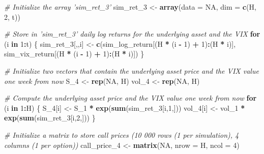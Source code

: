 \documentclass[]{article}
\newenvironment{Shaded}{\begin{snugshade}}{\end{snugshade}}
\newcommand{\CommentTok}[1]{\textcolor[rgb]{0.56,0.35,0.01}{\textit{#1}}}
\newcommand{\ControlFlowTok}[1]{\textcolor[rgb]{0.13,0.29,0.53}{\textbf{#1}}}
\newcommand{\DataTypeTok}[1]{\textcolor[rgb]{0.13,0.29,0.53}{#1}}
\newcommand{\DecValTok}[1]{\textcolor[rgb]{0.00,0.00,0.81}{#1}}
\newcommand{\KeywordTok}[1]{\textcolor[rgb]{0.13,0.29,0.53}{\textbf{#1}}}
\newcommand{\NormalTok}[1]{#1}
\newcommand{\OperatorTok}[1]{\textcolor[rgb]{0.81,0.36,0.00}{\textbf{#1}}}
\newcommand{\OtherTok}[1]{\textcolor[rgb]{0.56,0.35,0.01}{#1}}
\newcommand{\StringTok}[1]{\textcolor[rgb]{0.31,0.60,0.02}{#1}}
\begin{document}
\begin{Shaded}
\begin{Highlighting}[]
\CommentTok{# Initialize the array 'sim_ret_3'}
\NormalTok{sim_ret_}\DecValTok{3}\NormalTok{ <-}\StringTok{ }\KeywordTok{array}\NormalTok{(}\DataTypeTok{data =} \OtherTok{NA}\NormalTok{, }\DataTypeTok{dim =} \KeywordTok{c}\NormalTok{(H, }\DecValTok{2}\NormalTok{, t))}

\CommentTok{# Store in 'sim_ret_3' daily log returns for the underlying asset and the VIX}
\ControlFlowTok{for}\NormalTok{ (i }\ControlFlowTok{in} \DecValTok{1}\OperatorTok{:}\NormalTok{t) \{}
\NormalTok{  sim_ret_}\DecValTok{3}\NormalTok{[,,i] <-}\StringTok{ }\KeywordTok{c}\NormalTok{(sim_log_return[(H }\OperatorTok{*}\StringTok{ }\NormalTok{(i }\OperatorTok{-}\StringTok{ }\DecValTok{1}\NormalTok{) }\OperatorTok{+}\StringTok{ }\DecValTok{1}\NormalTok{)}\OperatorTok{:}\NormalTok{(H }\OperatorTok{*}\StringTok{ }\NormalTok{i)], sim_vix_return[(H }\OperatorTok{*}\StringTok{ }\NormalTok{(i }\OperatorTok{-}\StringTok{ }\DecValTok{1}\NormalTok{) }\OperatorTok{+}\StringTok{ }\DecValTok{1}\NormalTok{)}\OperatorTok{:}\NormalTok{(H }\OperatorTok{*}\StringTok{ }\NormalTok{i)])}
\NormalTok{\}}

\CommentTok{# Initialize two vectors that contain the underlying asset price and the VIX value one week from now}
\NormalTok{S_}\DecValTok{4}\NormalTok{   <-}\StringTok{ }\KeywordTok{rep}\NormalTok{(}\OtherTok{NA}\NormalTok{, H)}
\NormalTok{vol_}\DecValTok{4}\NormalTok{ <-}\StringTok{ }\KeywordTok{rep}\NormalTok{(}\OtherTok{NA}\NormalTok{, H)}

\CommentTok{# Compute the underlying asset price and the VIX value one week from now}
\ControlFlowTok{for}\NormalTok{ (i }\ControlFlowTok{in} \DecValTok{1}\OperatorTok{:}\NormalTok{H) \{}
\NormalTok{  S_}\DecValTok{4}\NormalTok{[i]   <-}\StringTok{ }\NormalTok{S_}\DecValTok{1} \OperatorTok{*}\StringTok{ }\KeywordTok{exp}\NormalTok{(}\KeywordTok{sum}\NormalTok{(sim_ret_}\DecValTok{3}\NormalTok{[i,}\DecValTok{1}\NormalTok{,]))}
\NormalTok{  vol_}\DecValTok{4}\NormalTok{[i] <-}\StringTok{ }\NormalTok{vol_}\DecValTok{1} \OperatorTok{*}\StringTok{ }\KeywordTok{exp}\NormalTok{(}\KeywordTok{sum}\NormalTok{(sim_ret_}\DecValTok{3}\NormalTok{[i,}\DecValTok{2}\NormalTok{,]))}
\NormalTok{\}}

\CommentTok{# Initialize a matrix to store call prices (10 000 rows (1 per simulation), 4 columns (1 per option))}
\NormalTok{call_price_}\DecValTok{4}\NormalTok{ <-}\StringTok{ }\KeywordTok{matrix}\NormalTok{(}\OtherTok{NA}\NormalTok{, }\DataTypeTok{nrow =}\NormalTok{ H, }\DataTypeTok{ncol =} \DecValTok{4}\NormalTok{)}


\end{Highlighting}
\end{Shaded}
\end{document}
